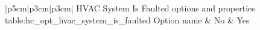 \begin{customLongTable}{ |p{5cm}|p{3cm}|p{3cm}| }
{HVAC System Is Faulted options and properties} {table:hc_opt_hvac_system_is_faulted}
{Option name & No & Yes}
\endhead
\hline
\end{customLongTable}
